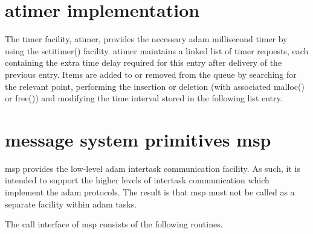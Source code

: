 \section {atimer implementation}

The timer facility, atimer, provides the necessary adam millisecond timer
by using the setitimer() facility. atimer maintains a linked list of
timer requests, each containing the extra time delay required for this
entry after delivery of the previous entry. Items are added to or removed
from the queue by searching for the relevant point, performing the
insertion or deletion (with associated malloc() or free()) and modifying
the time interval stored in the following list entry.

\section {message system primitives msp}

msp provides the low-level adam intertask communication facility. As
such, it is intended to support the higher levels of intertask
communication which implement the adam protocols. The result is that msp
must not be called as a separate facility within adam tasks.

The call interface of msp consists of the following routines.


